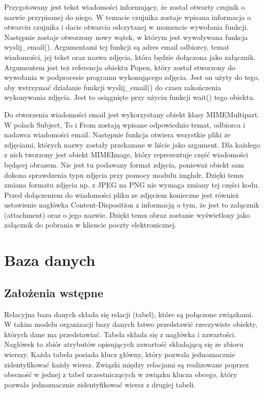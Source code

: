 \documentclass[a4paper,12pt,twoside]{article}
\begin{document}
Przygotowany jest tekst wiadomości informujący, że został otwarty czujnik o nazwie przypisanej do niego. W temacie czujnika zostaje wpisana informacja o otwarciu czujnika i dacie otwarcia odczytanej w momencie wywołania funkcji. Następnie zostaje otworzony nowy wątek, w którym jest wywoływana funkcja wyslij{\_}email(). Argumentami tej funkcji są adres email odbiorcy, temat wiadomości, jej tekst oraz nazwa zdjęcia, która będzie dołączona jako załącznik. Argumentem jest też referencja obiektu Popen, który został stworzony do wywołania w podprocesie programu wykonującego zdjęcia. Jest on użyty do tego, aby wstrzymać działanie funkcji wyslij{\_}email() do czasu zakończenia wykonywania zdjęcia. Jest to osiągnięte przy użyciu funkcji wait() tego obiektu.

Do stworzenia wiadomości email jest wykorzystany obiekt klasy MIMEMultipart. W polach Subject, To i From zostają wpisane odpowiednio temat, odbiorca i nadawca wiadomości email. Następnie funkcja otwiera wszystkie pliki ze zdjęciami, których nazwy zostały przekazane w liście jako argument. Dla każdego z nich tworzony jest obiekt MIMEImage, który reprezentuje część wiadomości będącej obrazem. Nie jest tu podawany format zdjęcia, ponieważ obiekt sam dokona sprawdzenia typu zdjęcia przy pomocy modułu imghdr. Dzięki temu zmiana formatu zdjęcia np. z JPEG na PNG nie wymaga zmiany tej części kodu. Przed dołączeniem do wiadomości pliku ze zdjęciem konieczne jest również ustawienie nagłówka Content-Disposition z informacją o tym, że jest to załącznik (attachment) oraz o jego nazwie. Dzięki temu obraz zostanie wyświetlony jako załącznik do pobrania w kliencie poczty elektronicznej.

\section{Baza danych}
\subsection{Założenia wstępne}
Relacyjna baza danych składa się relacji (tabel), które są połączone związkami. W takim modelu organizacji bazy danych łatwo przedstawić rzeczywiste obiekty, których dane ma przedstawiać. Tabela składa się z nagłówka i zawartości. Nagłówek to zbiór atrybutów opisujących zawartość składającą się ze zbioru wierszy. Każda tabela posiada klucz główny, który pozwala jednoznacznie zidentyfikować każdy wiersz. Związki między relacjami są realizowane poprzez obecność w jednej z tabel uczestniczących w związku klucza obcego, który pozwala jednoznacznie zidentyfikować wiersz z drugiej tabeli.
\end{document}
